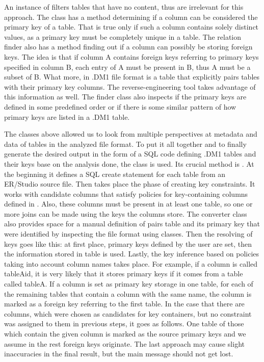 An instance of  filters tables that have no content, thus are irrelevant for this approach.
The class has a method determining if a column can be considered the primary key of a table. 
That is true only if such a column contains solely distinct values, as a primary key must be completely unique in a table.
The relation finder also has a method finding out if a column can possibly be storing foreign keys. The idea is that if column A contains foreign keys referring to primary keys specified in column B, each entry of A must be present in B, thus A must be a subset of B.
What more, in .DM1 file format is a table  that explicitly pairs tables with their primary key columns. 
The reverse-engineering tool takes advantage of this information as well.
The finder class also inspects if the primary keys are defined in some predefined order or if there is some similar pattern of how primary keys are listed in a .DM1 table.

The classes above allowed us to look from multiple perspectives at metadata and data of tables in the analyzed file format.
To put it all together and to finally generate the desired output in the form of a SQL code defining .DM1 tables and their keys base on the analysis done, the class  is used.
Its crucial method is . 
At the beginning it defines a SQL create statement for each table from an ER/Studio source file. 
Then takes place the phase of creating key constraints. 
It works with candidate columns that satisfy policies for key-containing columns defined in .
Also, these columns must be present in at least one table, so one or more joins can be made using the keys the columns store.
The converter class also provides space for a manual definition of pairs table and its primary key that were identified by inspecting the file format using  classes.
Then the resolving of keys goes like this: at first place, primary keys defined by the user are set, then the information stored in  table is used. Lastly, the key inference based on policies taking into account column names takes place. 
For example, if a column is called tableA\textunderscore id, it is very likely that it stores primary keys if it comes from a table called tableA.
If a column is set as primary key storage in one table, for each of the remaining tables that contain a column with the same name, the column is marked as a foreign key referring to the first table.
In the case that there are columns, which were chosen as candidates for key containers, but no constraint was assigned to them in previous steps, it goes as follows. One table of those which contain the given column is marked as the source primary keys and we assume in the rest foreign keys originate. The last approach may cause slight inaccuracies in the final result, but the main message should not get lost.

